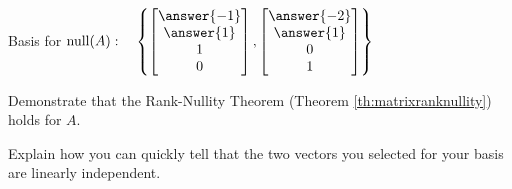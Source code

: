 \documentclass{ximera}
\begin{document}
\begin{problem}
\begin{question}
Basis for $\mbox{null}(A):\quad \left\{ \begin{bmatrix}\answer{-1}\\\answer{1}\\1\\0\end{bmatrix}, \begin{bmatrix}\answer{-2}\\\answer{1}\\0\\1\end{bmatrix}\right\}$

Demonstrate that the Rank-Nullity Theorem (Theorem \ref{th:matrixranknullity}) holds for $A$.

Explain how you can quickly tell that the two vectors you selected for your basis are linearly independent.
\end{question}
\end{problem}
\end{document}
